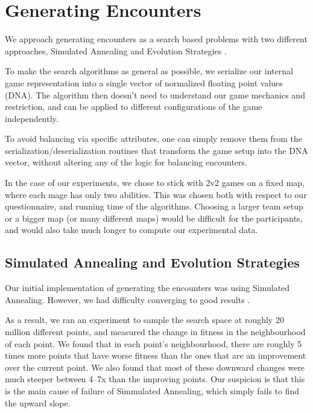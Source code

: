 \chapter{Generating Encounters}

We approach generating encounters as a search based problems with two different
approaches, Simulated Annealing \citep{ai-modern} and Evolution Strategies
\citep{evolution-strategies}.

To make the search algorithms as general as possible, we serialize our
internal game representation into a single vector of normalized floating
point values (DNA). The algorithm then doesn't need to understand our game
mechanics and restriction, and can be applied to different configurations of
the game independently.

To avoid balancing via specific attributes, one can simply remove them from
the serialization/deserialization routines that transform the game setup into
the DNA vector, without altering any of the logic for balancing encounters.

In the case of our experiments, we chose to stick with 2v2 games on a fixed map,
where each mage has only two abilities. This was chosen both with respect to our
questionnaire, and running time of the algorithms. Choosing a larger team setup or
a bigger map (or many different maps) would be difficult for the participants,
and would also take much longer to compute our experimental data.



\section{Simulated Annealing and Evolution Strategies}

Our initial implementation of generating the encounters was using Simulated
Annealing. However, we had difficulty converging to good results .

As a result, we ran an experiment to sample the search space at roughly 20
million different points, and measured the change in fitness in the
neighbourhood of each point. We found that in each point's neighbourhood,
there are roughly 5 times more points that have worse fitness than the ones
that are an improvement over the current point. We also found that most of
these downward changes were much steeper between 4--7x than the improving
points. Our suspicion is that this is the main cause of failure of
Simmulated Annealing, which simply fails to find the upward slope.

